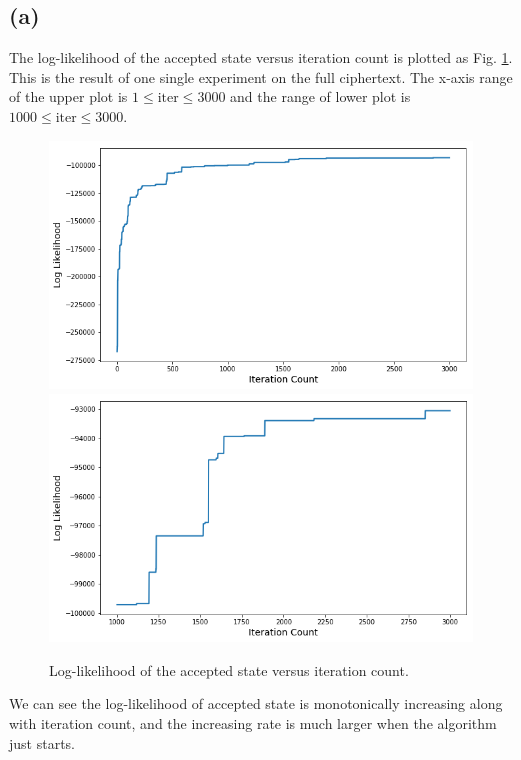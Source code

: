 \documentclass[12pt,aps,pre,reprint]{revtex4-1}
\begin{document}
\subsection{(a)}
The log-likelihood of the accepted state versus iteration count is plotted as Fig. \ref{fig:log-likelihood}. This is the result of one single experiment on the full ciphertext. The x-axis range of the upper plot is $1\leq\text{iter}\leq3000$ and the range of lower plot is $1000\leq\text{iter}\leq3000$.
\begin{figure}[H]
	\centering
	\includegraphics[width=0.9\linewidth]{pics/log-likelihood-1.png}
	\includegraphics[width=0.9\linewidth]{pics/log-likelihood-2.png}
	\caption{Log-likelihood of the accepted state versus iteration count.}
	\label{fig:log-likelihood}
\end{figure}
We can see the log-likelihood of accepted state is monotonically increasing along with iteration count, and the increasing rate is much larger when the algorithm just starts.
\end{document}
